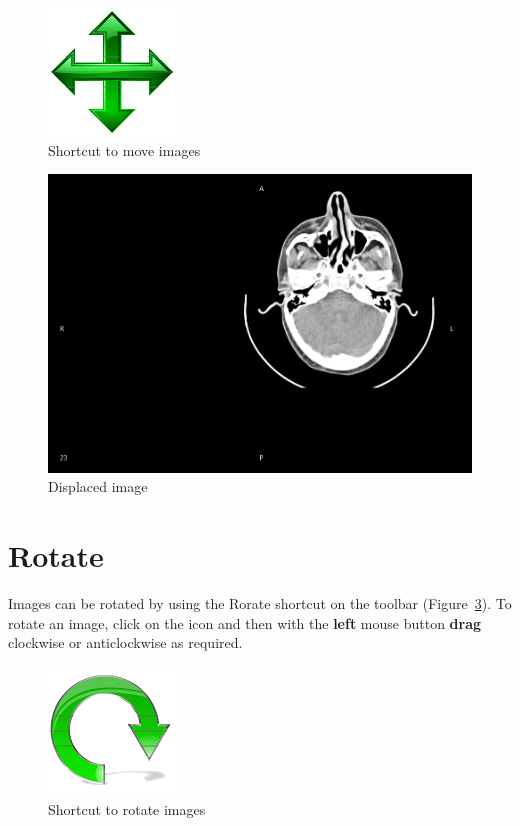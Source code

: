 \begin{figure}[!htb]
\centering
\includegraphics[scale=0.25]{../user_guide_figures/icons/tool_translate_original.png}
\caption{Shortcut to move images}
\label{fig:move_icon}
\end{figure}

\begin{figure}[!htb]
\centering
\includegraphics[scale=0.20]{../user_guide_figures/invesalius_screen/axial_pan_en.png}
\caption{Displaced image}
\label{fig:move_img}
\end{figure}

\section{Rotate}

Images can be rotated by using the Rorate shortcut on the toolbar (Figure~\ref{fig:rot_icon}). To rotate an image, click on the icon and then with the \textbf{left} mouse button \textbf{drag} clockwise or anticlockwise as required.

\begin{figure}[!htb]
\centering
\includegraphics[scale=0.20]{../user_guide_figures/icons/tool_rotate_original.png}
\caption{Shortcut to rotate images}
\label{fig:rot_icon}
\end{figure}

